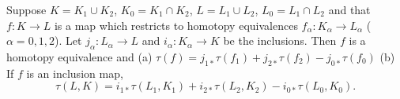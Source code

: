 Suppose $K = K_1 \cup K_2$, $K_0 = K_1 \cap K_2$, $L = L_1 \cup L_2$, $L_0 = L_1 \cap L_2$ and that $f: K \rightarrow L$ is a map which restricts to homotopy equivalences $f_\alpha: K_\alpha \rightarrow L_\alpha$ ($\alpha = 0, 1, 2$). Let $j_\alpha: L_\alpha \rightarrow L$ and $i_\alpha: K_\alpha \rightarrow K$ be the inclusions. Then $f$ is a homotopy equivalence and
(a) $\tau(f) = j_{1*}\tau(f_1) + j_{2*}\tau(f_2) - j_{0*}\tau(f_0)$
(b) If $f$ is an inclusion map,
$$\tau(L, K) = i_{1*}\tau(L_1, K_1) + i_{2*}\tau(L_2, K_2) - i_{0*}\tau(L_0, K_0).$$

